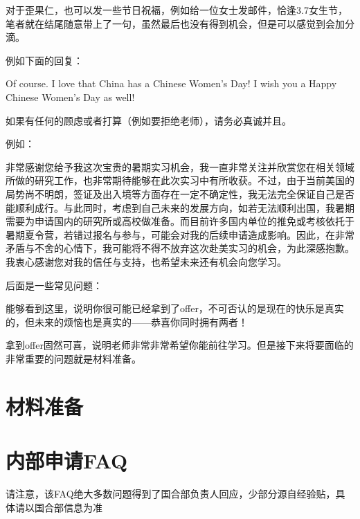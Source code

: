 对于歪果仁，也可以发一些节日祝福，例如给一位女士发邮件，恰逢3.7女生节，笔者就在结尾随意带上了一句，虽然最后也没有得到机会，但是可以感觉到会加分滴。

例如下面的回复：

\begin{presentbox} 

  \noindent   Of course.  I love that China has a Chinese Women’s Day!  I wish you a Happy Chinese Women’s Day as well!
\end{presentbox}

\begin{remark}
    如果有任何的顾虑或者打算（例如要拒绝老师），请务必真诚并且。

    例如：

    非常感谢您给予我这次宝贵的暑期实习机会，我一直非常关注并欣赏您在相关领域所做的研究工作，也非常期待能够在此次实习中有所收获。不过，由于当前美国的局势尚不明朗，签证及出入境等方面存在一定不确定性，我无法完全保证自己是否能顺利成行。与此同时，考虑到自己未来的发展方向，如若无法顺利出国，我暑期需要为申请国内的研究所或高校做准备。而目前许多国内单位的推免或考核依托于暑期夏令营，若错过报名与参与，可能会对我的后续申请造成影响。因此，在非常矛盾与不舍的心情下，我可能将不得不放弃这次赴美实习的机会，为此深感抱歉。我衷心感谢您对我的信任与支持，也希望未来还有机会向您学习。

    
\end{remark}

\textcolor{red!70!black}{ }后面是一些常见问题：





\begin{notebox}[写在前面]

能够看到这里，说明你很可能已经拿到了offer，不可否认的是现在的快乐是真实的，但未来的烦恼也是真实的——恭喜你同时拥有两者！

拿到offer固然可喜，说明老师非常非常希望你能前往学习。但是接下来将要面临的非常重要的问题就是材料准备。

\end{notebox}

\section{材料准备}

\section*{内部申请FAQ}
{\small 请注意，该FAQ绝大多数问题得到了国合部负责人回应，少部分源自经验贴，具体请以国合部信息为准} 

